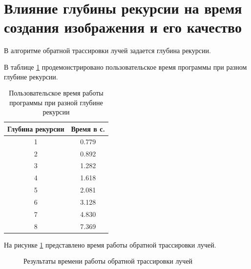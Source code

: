 \section{Влияние глубины рекурсии на время создания изображения и его качество}

В алгоритме обратной трассировки лучей задается глубина рекурсии.

В таблице \ref{tab:time1} продемонстрировано пользовательское время программы при разном глубине рекурсии.

\begin{table}[ht!]
	\begin{center}
		
		\caption{Пользовательское время работы программы при разной глубине рекурсии}
		\label{tab:time1}
		\begin{tabular}{|c|c|}
			\hline
			Глубина рекурсии & Время в с. \\
			\hline
			1  & 0.779 \\
			\hline
			2  & 0.892 \\
			\hline
			3  & 1.282 \\
			\hline
			4  & 1.618 \\
			\hline
			5  & 2.081 \\
			\hline
			6  & 3.128\\
			\hline
			7  & 4.830\\
			\hline
			8  & 7.369\\
			\hline
			
		\end{tabular}
	\end{center}
\end{table}
\newpage
На рисунке \ref{graph:r} представлено время работы обратной трассировки лучей.

\begin{figure}[ht!]
	\begin{center}
		\captionsetup{singlelinecheck = false, justification=centerfirst}
		\centering
		\caption{Результаты времени работы обратной трассировки лучей}
		\label{graph:r}
	\end{center}
\end{figure}

